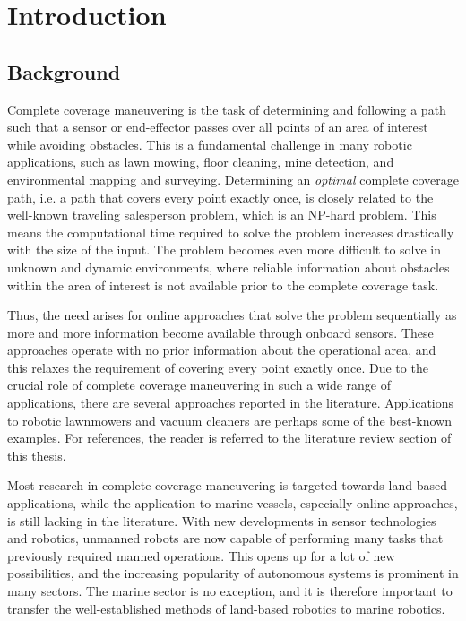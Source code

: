 \chapter{Introduction}

\section{Background}

Complete coverage maneuvering is the task of determining and following a path such that a sensor or end-effector passes over all points of an area of interest while avoiding obstacles. This is a fundamental challenge in many robotic applications, such as lawn mowing, floor cleaning, mine detection, and environmental mapping and surveying. Determining an \emph{optimal} complete coverage path, i.e. a path that covers every point exactly once, is closely related to the well-known traveling salesperson problem, which is an NP-hard problem. %
This means the computational time required to solve the problem increases drastically with the size of the input. The problem becomes even more difficult to solve in unknown and dynamic environments, where reliable information about obstacles within the area of interest is not available prior to the complete coverage task.

Thus, the need arises for online approaches that solve the problem sequentially as more and more information become available through onboard sensors. These approaches operate with no prior information about the operational area, and this relaxes the requirement of covering every point exactly once. Due to the crucial role of complete coverage maneuvering in such a wide range of applications, there are several approaches reported in the literature. Applications to robotic lawnmowers and vacuum cleaners are perhaps some of the best-known examples. For references, the reader is referred to the literature review section of this thesis.

Most research in complete coverage maneuvering is targeted towards land-based applications, while the application to marine vessels, especially online approaches, is still lacking in the literature. With new developments in sensor technologies and robotics, unmanned robots are now capable of performing many tasks that previously required manned operations. This opens up for a lot of new possibilities, and the increasing popularity of autonomous systems is prominent in many sectors. The marine sector is no exception, and it is therefore important to transfer the well-established methods of land-based robotics to marine robotics.

